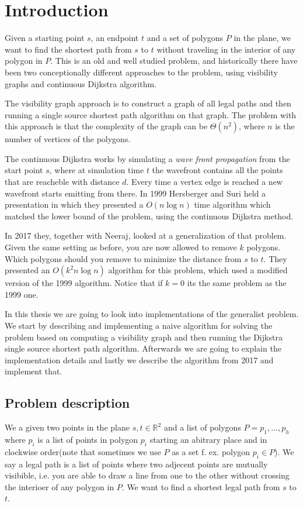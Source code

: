 \chapter{Introduction} Given a starting point $s$, an endpoint $t$ and a set of
polygons $P$ in the plane, we want to find the shortest path from $s$ to $t$ without
traveling in the interior of any polygon in $P$. 
This is an old and well studied problem, and historically there have been two
conceptionally different approaches to the problem, using visibility graphs and
continuous Dijkstra algorithm. 

The visibility graph approach is to construct a graph of all legal paths
 and
then running a single source shortest path algorithm on that graph. The problem
with this approach is that the complexity of the graph can be $\Theta(n^2)$,
where $n$ is the number of vertices of the polygons. 

The continuous Dijkstra works by simulating a \emph{wave front
propagation} from the
start point $s$, where at simulation time $t$ the wavefront contains all the
points that are reacheble with distance $d$.  Every time a vertex edge is
reached a new wavefront starts emitting from there. In 1999 Hersberger and Suri
held a presentation in which they presented a $O(n\log n)$ time algorithm which
matched the lower bound of the problem, using the continuous Dijkstra method.

In 2017 they, together with Neeraj, looked at a generalization of that problem.
Given the same setting as before, you are now allowed to remove $k$ polygons.
Which polygons should you remove to minimize the distance from $s$ to $t$. They
presented an $O(k^2 n\log n)$ algorithm for this problem, which used a modified
version of the 1999 algorithm. Notice that if $k=0$ its the same problem as the
1999 one.

In this thesis we are going to look into implementations of the generalist
problem. We start by describing and implementing a naive algorithm for solving
the problem based on computing a visibility graph and then running the Dijkstra
single source shortest path algorithm. Afterwards we are going to explain the
implementation details and lastly we describe the algorithm from 2017 and
implement that.

\section{Problem description} 
We a given two points in the plane $s,t\in\mathbb{R}^2$ and a list of polygons
$P=p_1,\dots,p_h$ where $p_i$ is a list of points in polygon $p_i$ starting an
abitrary place and in clockwise order(note that sometimes we use $P$ as a set
f. ex. polygon $p_i\in P$). We say a legal path is a list of points where two
adjecent points are mutually visibible, i.e. you are able to draw a line from
one to the other without crossing the interioer of any polygon in $P$. 
We want to find a shortest legal path from $s$ to $t$.

